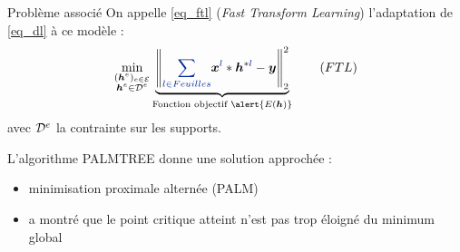 \begin{frame}{Problème associé}
On appelle \eqref{eq_ftl} (\emph{Fast Transform Learning}) l'adaptation de \eqref{eq_dl} à ce modèle :
\begin{equation*}
\min_{\substack{(\h^e)_{e \in \E} \\ \h^e \in \Dspace^e}}
	\underbrace{\norm{\Beq{\sum_{l \in Feuilles}} \x^{\Beq{l}} * \h^{*\Beq{l}} -\y}{2}^2}_{\text{Fonction objectif } \alert{E(\h)}} \tag{${FTL}$} \label{eq_ftl}
\end{equation*}
avec ${\mathcal D}^e$ la contrainte sur les supports.

L'algorithme \alert{PALMTREE} donne une solution approchée :
\begin{itemize}
	\item minimisation proximale alternée (PALM)
	\item \cite{chabiron_optimization_2016} a montré que le point  critique atteint n'est pas trop éloigné du minimum global
\end{itemize}
\end{frame}

